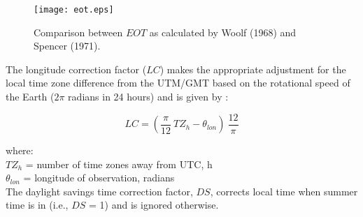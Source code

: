 \begin{figure}[ht!]
    \texttt{[image: eot.eps]}
    \caption{Comparison between $EOT$ as calculated by Woolf (1968) and Spencer (1971).}
    \label{fig:eot}
\end{figure}

The longitude correction factor ($LC$) makes the appropriate adjustment for the local time zone difference from the UTM/GMT based on the rotational speed of the Earth ($2\pi$ radians in 24 hours) and is given by \parencite{stine01}:

%
%
\begin{equation}
\label{eq:lc}
    LC = \left(\frac{\pi}{12}\: TZ_h - \theta_{lon}\right)\:
    \frac{12}{\pi}
\end{equation}

\noindent where: \\
\indent $TZ_{h}$ = number of time zones away from UTC, h \\
\indent $\theta_{lon}$ = longitude of observation, radians \\

The daylight savings time correction factor, $DS$, corrects local time when summer time is in (i.e., $DS$ = 1) and is ignored otherwise.

